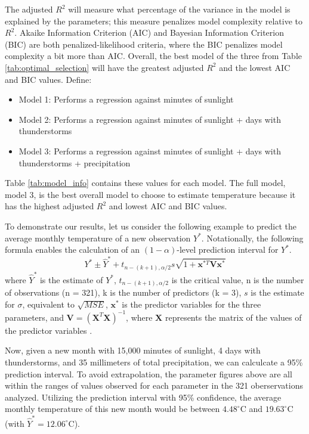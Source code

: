 The adjusted $R^{2}$ will measure what percentage of the variance in the model is explained by the parameters; this measure penalizes model complexity relative to $R^{2}$. Akaike Information Criterion (AIC) and Bayesian Information Criterion (BIC) are both penalized-likelihood criteria, where the BIC penalizes model complexity a bit more than AIC. Overall, the best model of the three from Table \ref{tab:optimal_selection} will have the greatest adjusted $R^{2}$ and the lowest AIC and BIC values. Define: 

\begin{itemize}
	\item Model 1: Performs a regression against minutes of sunlight
	\item Model 2: Performs a regression against minutes of sunlight + days with thunderstorms
	\item Model 3: Performs a regression against minutes of sunlight + days with thunderstorms + precipitation
\end{itemize} 

Table \ref{tab:model_info} contains these values for each model. The full model, model 3, is the best overall model to choose to estimate temperature because it has the highest adjusted $R^{2}$ and lowest AIC and BIC values.

To demonstrate our results, let us consider the following example to predict the average monthly temperature of a new observation $Y^{*}$. Notationally, the following formula enables the calculation of an $(1-\alpha)$-level prediction interval for $Y^{*}$. $$Y^{*} \pm \hat{Y}^{*} + t_{n-(k+1),\alpha/2} s \sqrt{1+\textbf{x}^{*T}\textbf{V}\textbf{x}^{*}}$$ where $\hat{Y}^{*}$ is the estimate of $Y^{*}$, $t_{n-(k+1),\alpha/2}$ is the critical value, n is the number of observations (n = 321), k is the number of predictors (k = 3), $s$ is the estimate for $\sigma$, equivalent to $\sqrt{MSE}$, $\textbf{x}^{*}$ is the predictor variables for the three parameters, and $\textbf{V} = (\textbf{X}^{T}\textbf{X})^{-1}$, where $\textbf{X}$ represents the matrix of the values of the predictor variables \cite{tamhane}.

Now, given a new month with 15,000 minutes of sunlight, 4 days with thunderstorms, and 35 millimeters of total precipitation, we can calculcate a 95\% prediction interval. To avoid extrapolation, the parameter figures above are all within the ranges of values observed for each parameter in the 321 oberservations analyzed. Utilizing the prediction interval with 95\% confidence, the average monthly temperature of this new month would be between $4.48^{\circ}$C and $19.63^{\circ}$C (with $\hat{Y}^{*} = 12.06^{\circ}$C).

